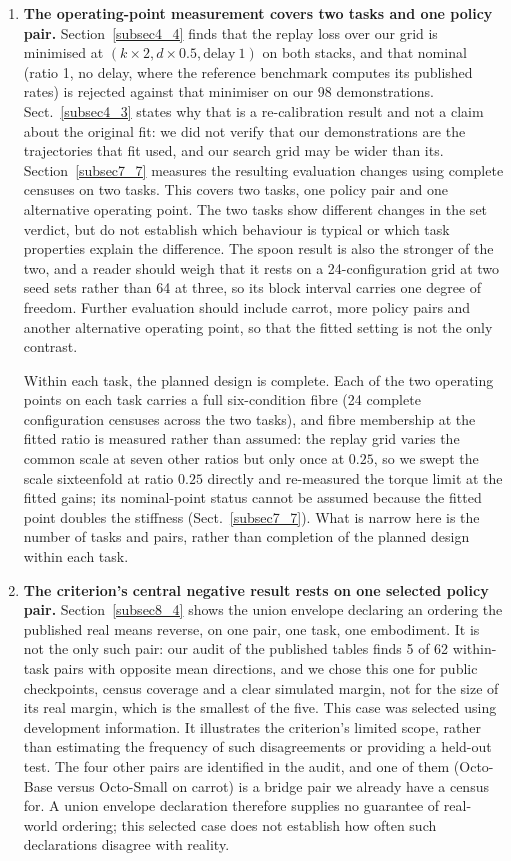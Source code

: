 \documentclass[pdflatex,iicol,sn-apa]{sn-jnl}
\theoremstyle{remark}
\begin{document}
\begin{enumerate}
\item \textbf{The operating-point measurement covers two tasks and one policy pair.}
Section~\ref{subsec4_4} finds that the replay loss over our grid is minimised at
$(k{\times}2, d{\times}0.5, \text{delay}\ 1)$ on both stacks, and that nominal (ratio 1, no delay,
where the reference benchmark computes its published rates) is rejected against that minimiser on our 98
demonstrations. Sect.~\ref{subsec4_3} states why that is a re-calibration result and not a claim
about the original fit: we did not verify that our demonstrations are the trajectories that fit
used, and our search grid may be wider than its.
Section~\ref{subsec7_7} measures the resulting evaluation changes using complete censuses on two tasks. This covers two tasks, one
policy pair and one alternative operating point. The two tasks show different changes in the set
verdict, but do not establish which behaviour is typical or which task properties explain the
difference. The spoon result is also the stronger
of the two, and a reader should weigh that it rests on a 24-configuration grid at two seed sets
rather than 64 at three, so its block interval carries one degree of freedom. Further evaluation
should include carrot, more policy pairs and another alternative operating point, so that the
fitted setting is not the only contrast.

Within each task, the planned design is complete. Each of the two operating points on each task carries a full six-condition
fibre (24 complete configuration censuses across the two tasks), and fibre membership at
the fitted ratio is measured rather than assumed: the replay grid varies the common scale at seven
other ratios but only once at $0.25$, so we swept the scale sixteenfold at ratio $0.25$ directly and
re-measured the torque limit at the fitted gains; its nominal-point status cannot be assumed because the
fitted point doubles the stiffness (Sect.~\ref{subsec7_7}). What is narrow here is the number of
tasks and pairs, rather than completion of the planned design within each task.

\item \textbf{The criterion's central negative result rests on one selected policy pair.}
Section~\ref{subsec8_4} shows the union envelope declaring an ordering the published real means
reverse, on one pair, one task, one embodiment. It is not the only such pair: our audit of the
published tables finds 5 of 62 within-task pairs with opposite mean directions, and we chose this one
for public checkpoints, census coverage and a clear simulated margin, not for the size of its
real margin, which is the smallest of the five. This case was selected using development
information. It illustrates the criterion's limited scope, rather than estimating the frequency
of such disagreements or providing a held-out test. The four other pairs are identified in the
audit, and one of them
(Octo-Base versus Octo-Small on carrot) is a bridge pair we already have a census for.
A union envelope declaration therefore supplies no guarantee of real-world ordering; this selected
case does not establish how often such declarations disagree with reality.


\end{enumerate}
\end{document}

